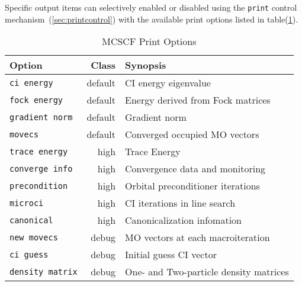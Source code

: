 Specific output items can selectively enabled or disabled using the
\verb+print+ control mechanism~(\ref{sec:printcontrol}) with the
available print options listed in table(\ref{MCSCF_print_options}).

\begin{table}
\caption{MCSCF Print Options}
\label{MCSCF_print_options}
\vspace{.2in}
\begin{tabular}{lrl}
\hline\hline
Option                          & Class    &  Synopsis \\
\hline
\verb+ci energy+                & default  &  CI energy eigenvalue \\
\verb+fock energy+              & default  &  Energy derived from Fock matrices \\
\verb+gradient norm+            & default  &  Gradient norm \\
\verb+movecs+                   & default  &  Converged occupied MO vectors \\
\verb+trace energy+             & high     &  Trace Energy \\
\verb+converge info+            & high     &  Convergence data and monitoring \\
\verb+precondition+             & high     &  Orbital preconditioner iterations \\
\verb+microci+                  & high     &  CI iterations in line search \\
\verb+canonical+                & high     &  Canonicalization infomation \\
\verb+new movecs+               & debug    &  MO vectors at each macroiteration \\
\verb+ci guess+                 & debug    &  Initial guess CI vector \\
\verb+density matrix+           & debug    &  One- and Two-particle density matrices \\
\hline\hline
\end{tabular}
\end{table}


